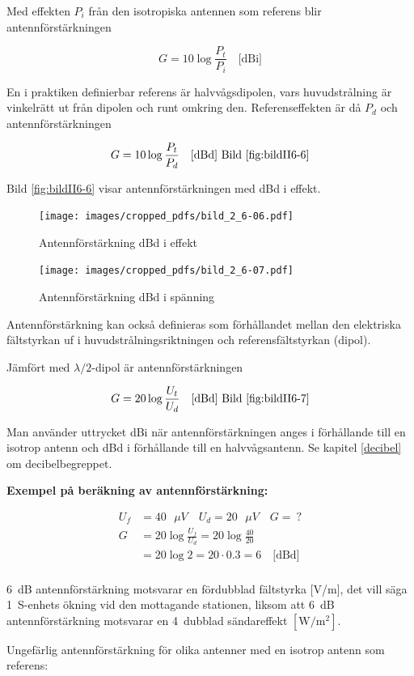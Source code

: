 Med effekten \(P_i\) från den isotropiska antennen som referens blir
antennförstärkningen

\[G = 10 \log\frac{P_t}{P_i} \quad \text{[dBi]}\]

En i praktiken definierbar referens är halvvågsdipolen, vars
huvudstrålning är vinkelrätt ut från dipolen och runt omkring den.
Referenseffekten är då \(P_d\) och antennförstärkningen

\[G = 10 \log\frac{P_t}{P_d} \quad \text{[dBd] Bild \ref{fig:bildII6-6}}\]

Bild \ref{fig:bildII6-6} visar antennförstärkningen med dBd i effekt.

\begin{figure}
  \texttt{[image: images/cropped\_pdfs/bild\_2\_6-06.pdf]}
  \caption{Antennförstärkning dBd i effekt}
  \label{fig:bildII6-6}

  \texttt{[image: images/cropped\_pdfs/bild\_2\_6-07.pdf]}
  \caption{Antennförstärkning dBd i spänning}
  \label{fig:bildII6-7}
\end{figure}

Antennförstärkning kan också definieras som förhållandet mellan den elektriska
fältstyrkan uf i huvudstrålningsriktningen och referensfältstyrkan (dipol).

Jämfört med \(\lambda/2\)-dipol är antennförstärkningen

\[G = 20 \log\frac{U_t}{U_d} \quad \text{[dBd] Bild \ref{fig:bildII6-7}}\]

Man använder uttrycket dBi när antennförstärkningen anges i förhållande till
en isotrop antenn och dBd i förhållande till en halvvågsantenn.
Se kapitel \ref{decibel} om decibelbegreppet.

\textbf{Exempel på beräkning av antennförstärkning:}

\begin{align*}
  U_f &= 40\text{ \(\mu V\)} \quad U_d = 20\text{ \(\mu V\)} \quad G =\ ? \\
  G &= 20 \log\frac{U_f}{U_d} = 20 \log\frac{40}{20} \\
  &= 20 \log 2 = 20\cdot 0.3 = 6 \quad \text{[dBd]} \\
\end{align*}

6~dB antennförstärkning motsvarar en fördubblad fältstyrka [V/m], det vill säga
1~S-enhets ökning vid den mottagande stationen, liksom att 6~dB
antennförstärkning motsvarar en 4~dubblad sändareffekt \(\mathrm{[W/m^2]}\).

Ungefärlig antennförstärkning för olika antenner med en isotrop antenn som
referens:

